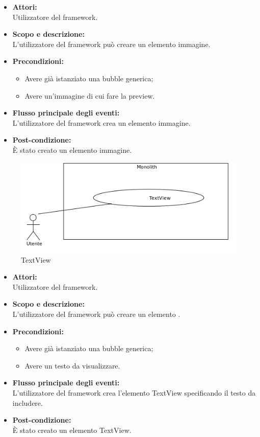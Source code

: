 \begin{itemize}
	\item \textbf{Attori:}
	\\Utilizzatore del framework.
	\item \textbf{Scopo e descrizione:} 
	\\L'utilizzatore del framework può creare un elemento immagine.
	\item \textbf{Precondizioni:}
	\begin{itemize}
		\item Avere già istanziato una bubble generica;
		\item Avere un'immagine di cui fare la preview.
	\end{itemize}
	\item \textbf{Flusso principale degli eventi:}
	\\L'utilizzatore del framework crea un elemento immagine.
	\item \textbf{Post-condizione:}
	\\È stato creato un elemento immagine.
\end{itemize}


\begin{figure}[H]
	\centering
	\includegraphics[width=15cm]{../../documenti/AnalisiDeiRequisiti/Diagrammi_img/uc1_26.png}
	\caption{\UCFFCaption{} TextView}
\end{figure}

\begin{itemize}
	\item \textbf{Attori:}
	\\Utilizzatore del framework.
	\item \textbf{Scopo e descrizione:} 
	\\L'utilizzatore del framework può creare un elemento .
	\item \textbf{Precondizioni:}
	\begin{itemize}
		\item Avere già istanziato una bubble generica;
		\item Avere un testo da visualizzare.
	\end{itemize}
	\item \textbf{Flusso principale degli eventi:}
	\\L'utilizzatore del framework crea l'elemento TextView specificando il testo da includere.
	\item \textbf{Post-condizione:}
	\\È stato creato un elemento TextView.
\end{itemize}

